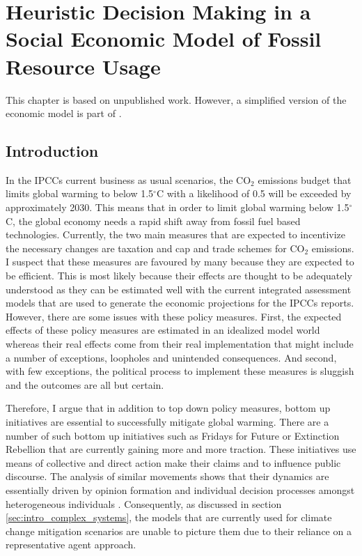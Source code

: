 \chapter{Heuristic Decision Making in a Social Economic Model of Fossil Resource Usage}
\label{chapter:heuristics}
This chapter is based on unpublished work. However, a simplified version of the economic model is part of \citep[P5]{Kolb2019b}.
\section{Introduction}

In the IPCCs current business as usual scenarios, the CO$_{2}$ emissions budget that limits global warming to below 1.5$^{\circ}$C with a likelihood of 0.5 will be exceeded by approximately 2030. This means that in order to limit global warming below 1.5$^{\circ}$C, the global economy needs a rapid shift away from fossil fuel based technologies. Currently, the two main measures that are expected to incentivize the necessary changes are taxation and cap and trade schemes for CO$_{2}$ emissions. I suspect that these measures are favoured by many because they are expected to be efficient. This is most likely because their effects are thought to be adequately understood as they can be estimated well with the current integrated assessment models that are used to generate the economic projections for the IPCCs reports. However, there are some issues with these policy measures. First, the expected effects of these policy measures are estimated in an idealized model world whereas their real effects come from their real implementation that might include a number of exceptions, loopholes and unintended consequences. And second, with few exceptions, the political process to implement these measures is sluggish and the outcomes are all but certain.

Therefore, I argue that in addition to top down policy measures, bottom up initiatives are essential to successfully mitigate global warming. 
There are a number of such bottom up initiatives such as Fridays for Future or Extinction Rebellion that are currently gaining more and more traction. These initiatives use means of collective and direct action make their claims and to influence public discourse. The analysis of similar movements shows that their dynamics are essentially driven by opinion formation and individual decision processes amongst heterogeneous individuals \citep{Graeber2009, Engler2016}. Consequently, as discussed in section \ref{sec:intro_complex_systems}, the models that are currently used for climate change mitigation scenarios are unable to picture them due to their reliance on a representative agent approach.

